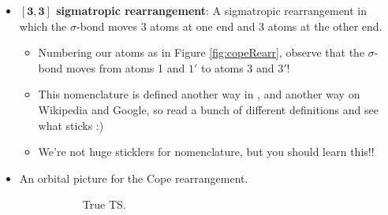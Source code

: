 \documentclass[../notes.tex]{subfiles}
\begin{document}
\begin{itemize}
\begin{figure}[h!]
    \end{figure}
    \begin{itemize}
        \item The Cope rearrangement proceeds circle arrows, as in any pericyclic reaction.
        \item It is reversible.
        \item It is thermal, typically occuring around \SI{200}{\celsius}.
        \item It is classified as a \textbf{$\bm{[3,3]}$ sigmatropic rearrangement}.
    \end{itemize}
    \item \textbf{$\bm{[3,3]}$ sigmatropic rearrangement}: A sigmatropic rearrangement in which the $\sigma$-bond moves 3 atoms at one end and 3 atoms at the other end.
    \begin{itemize}
        \item Numbering our atoms as in Figure \ref{fig:copeRearr}, observe that the $\sigma$-bond moves from atoms 1 and $1'$ to atoms 3 and $3'$!
        \item This nomenclature is defined another way in \textcite{bib:Clayden}, and another way on Wikipedia and Google, so read a bunch of different definitions and see what sticks :)
        \item We're not huge sticklers for nomenclature, but you should learn this!!
    \end{itemize}
    \item An orbital picture for the Cope rearrangement.
    \begin{figure}[h!]
        \centering
        \footnotesize
        \begin{subfigure}[b]{0.17\linewidth}
            \centering
            \chemleft{[}
            \chemright{]^\ddagger}
            \caption{True TS.}
            \label{fig:Copeorb3Da}
        \end{subfigure}
        \begin{subfigure}[b]{0.17\linewidth}
            \centering
            \chemleft{[}

\end{subfigure}
\end{figure}
\end{itemize}
\end{document}
